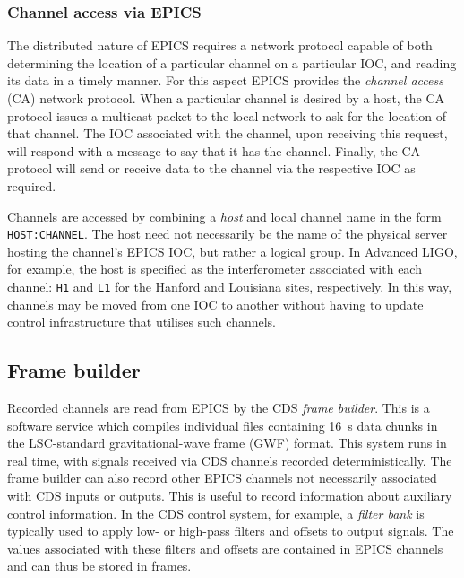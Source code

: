 \subsubsection{Channel access via EPICS}
The distributed nature of \gls{EPICS} requires a network protocol capable of both determining the location of a particular channel on a particular \gls{IOC}, and reading its data in a timely manner. For this aspect \gls{EPICS} provides the \emph{channel access} (\gls{CA}) network protocol. When a particular channel is desired by a host, the \gls{CA} protocol issues a multicast packet to the local network to ask for the location of that channel. The \gls{IOC} associated with the channel, upon receiving this request, will respond with a message to say that it has the channel. Finally, the \gls{CA} protocol will send or receive data to the channel via the respective \gls{IOC} as required.

Channels are accessed by combining a \emph{host} and local channel name in the form \lstinline!HOST:CHANNEL!. The host need not necessarily be the name of the physical server hosting the channel's \gls{EPICS} \gls{IOC}, but rather a logical group. In Advanced LIGO, for example, the host is specified as the interferometer associated with each channel: \lstinline!H1! and \lstinline!L1! for the Hanford and Louisiana sites, respectively. In this way, channels may be moved from one \gls{IOC} to another without having to update control infrastructure that utilises such channels.

\subsection{Frame builder}
Recorded channels are read from \gls{EPICS} by the \gls{CDS} \emph{frame builder}. This is a software service which compiles individual files containing \SI{16}{\second} data chunks in the \gls{LSC}-standard gravitational-wave frame (\gls{GWF}) format. This system runs in real time, with signals received via \gls{CDS} channels recorded deterministically. The frame builder can also record other EPICS channels not necessarily associated with \gls{CDS} inputs or outputs. This is useful to record information about auxiliary control information. In the \gls{CDS} control system, for example, a \emph{filter bank} is typically used to apply low- or high-pass filters and offsets to output signals. The values associated with these filters and offsets are contained in EPICS channels and can thus be stored in frames.

